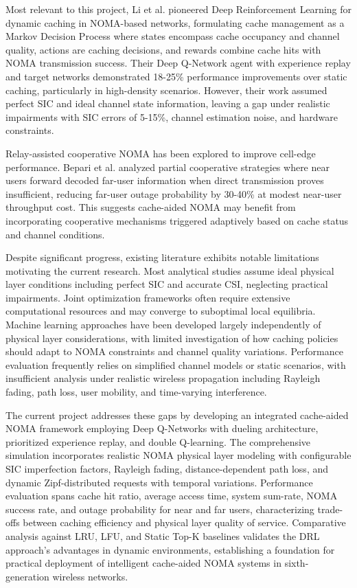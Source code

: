 \documentclass[12pt,a4paper]{article}
\begin{document}
Most relevant to this project, Li et al. \cite{li2021deep} pioneered Deep Reinforcement Learning for dynamic caching in NOMA-based networks, formulating cache management as a Markov Decision Process where states encompass cache occupancy and channel quality, actions are caching decisions, and rewards combine cache hits with NOMA transmission success. Their Deep Q-Network agent with experience replay and target networks demonstrated 18-25\% performance improvements over static caching, particularly in high-density scenarios. However, their work assumed perfect SIC and ideal channel state information, leaving a gap under realistic impairments with SIC errors of 5-15\%, channel estimation noise, and hardware constraints.

Relay-assisted cooperative NOMA has been explored to improve cell-edge performance. Bepari et al. \cite{bepari2023partial} analyzed partial cooperative strategies where near users forward decoded far-user information when direct transmission proves insufficient, reducing far-user outage probability by 30-40\% at modest near-user throughput cost. This suggests cache-aided NOMA may benefit from incorporating cooperative mechanisms triggered adaptively based on cache status and channel conditions.

Despite significant progress, existing literature exhibits notable limitations motivating the current research. Most analytical studies assume ideal physical layer conditions including perfect SIC and accurate CSI, neglecting practical impairments. Joint optimization frameworks often require extensive computational resources and may converge to suboptimal local equilibria. Machine learning approaches have been developed largely independently of physical layer considerations, with limited investigation of how caching policies should adapt to NOMA constraints and channel quality variations. Performance evaluation frequently relies on simplified channel models or static scenarios, with insufficient analysis under realistic wireless propagation including Rayleigh fading, path loss, user mobility, and time-varying interference.

The current project addresses these gaps by developing an integrated cache-aided NOMA framework employing Deep Q-Networks with dueling architecture, prioritized experience replay, and double Q-learning. The comprehensive simulation incorporates realistic NOMA physical layer modeling with configurable SIC imperfection factors, Rayleigh fading, distance-dependent path loss, and dynamic Zipf-distributed requests with temporal variations. Performance evaluation spans cache hit ratio, average access time, system sum-rate, NOMA success rate, and outage probability for near and far users, characterizing trade-offs between caching efficiency and physical layer quality of service. Comparative analysis against LRU, LFU, and Static Top-K baselines validates the DRL approach's advantages in dynamic environments, establishing a foundation for practical deployment of intelligent cache-aided NOMA systems in sixth-generation wireless networks.
\end{document}
